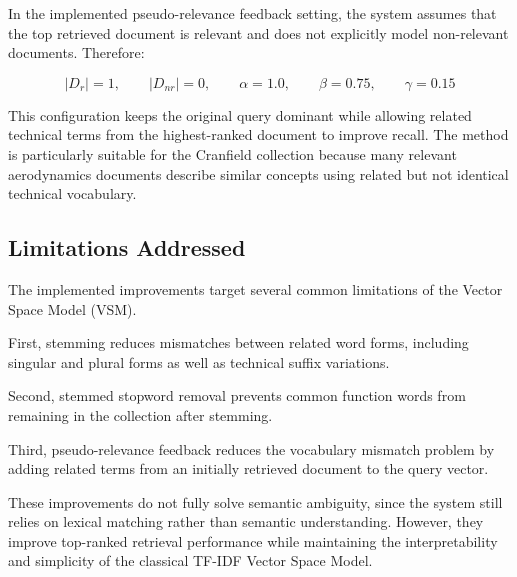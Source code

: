 In the implemented pseudo-relevance feedback setting, the system assumes that
the top retrieved document is relevant and does not explicitly model
non-relevant documents. Therefore:

\[
|D_r|=1,\qquad
|D_{nr}|=0,\qquad
\alpha=1.0,\qquad
\beta=0.75,\qquad
\gamma=0.15
\]

This configuration keeps the original query dominant while allowing related
technical terms from the highest-ranked document to improve recall. The method
is particularly suitable for the Cranfield collection because many relevant
aerodynamics documents describe similar concepts using related but not
identical technical vocabulary.

\subsection{Limitations Addressed}

The implemented improvements target several common limitations of the Vector
Space Model (VSM).

First, stemming reduces mismatches between related word forms, including
singular and plural forms as well as technical suffix variations.

Second, stemmed stopword removal prevents common function words from remaining
in the collection after stemming.

Third, pseudo-relevance feedback reduces the vocabulary mismatch problem by
adding related terms from an initially retrieved document to the query vector.

These improvements do not fully solve semantic ambiguity, since the system
still relies on lexical matching rather than semantic understanding.
However, they improve top-ranked retrieval performance while maintaining the
interpretability and simplicity of the classical TF-IDF Vector Space Model.
